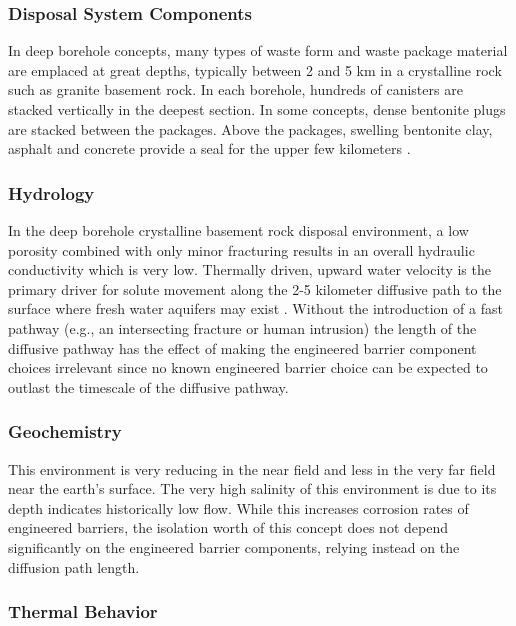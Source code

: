 

\subsubsection{Disposal System Components}

In deep borehole concepts, many types of  waste form and waste package material 
are emplaced at great depths, typically between 2 and 5 km 
\cite{hardin_generic_2011, clayton_generic_2011}
in a crystalline rock such as granite basement rock. In each borehole, hundreds
of canisters are stacked vertically in the deepest section. In some concepts, 
dense bentonite plugs are stacked between the packages. Above the packages, 
swelling bentonite clay, asphalt and concrete provide a seal for the upper few 
kilometers \cite{clayton_generic_2011}. 

\subsubsection{Hydrology}

In the deep borehole crystalline basement rock disposal environment, a low porosity
combined with only minor fracturing results in an overall 
hydraulic conductivity which is very low. Thermally driven, upward water 
velocity is the primary driver for solute movement along the 2-5
kilometer diffusive path to the surface where fresh water aquifers may exist
\cite{clayton_generic_2011}.
Without the introduction of a fast pathway (e.g., an intersecting fracture or 
human intrusion) the length of the diffusive pathway has the effect of making the 
engineered barrier component choices irrelevant since no known engineered 
barrier choice can be expected to outlast the timescale of the diffusive pathway.

\subsubsection{Geochemistry}

This environment is very reducing in the near field and less in the very 
far field near the earth's surface. The very high salinity of this environment
is due to its depth indicates historically low flow. While this increases 
corrosion rates of engineered barriers, the isolation worth of this concept 
does not depend significantly on the engineered barrier components, relying 
instead on the diffusion path length.  


\subsubsection{Thermal Behavior}
\label{subsec:boreholethermal}

